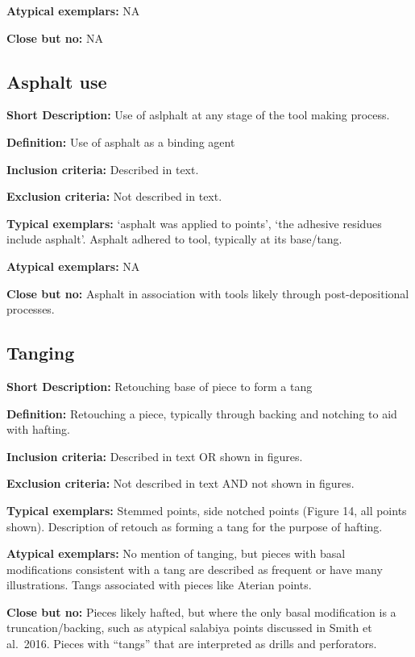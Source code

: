 \documentclass[
]{article}
\begin{document}
\textbf{Atypical exemplars:} NA

\textbf{Close but no:} NA

\hypertarget{asphalt-use}{%
\subsection{Asphalt use}\label{asphalt-use}}

\textbf{Short Description:} Use of aslphalt at any stage of the tool
making process.

\textbf{Definition:} Use of asphalt as a binding agent

\textbf{Inclusion criteria:} Described in text.

\textbf{Exclusion criteria:} Not described in text.

\textbf{Typical exemplars:} `asphalt was applied to points', `the
adhesive residues include asphalt'. Asphalt adhered to tool, typically
at its base/tang.

\textbf{Atypical exemplars:} NA

\textbf{Close but no:} Asphalt in association with tools likely through
post-depositional processes.

\hypertarget{tanging}{%
\subsection{Tanging}\label{tanging}}

\textbf{Short Description:} Retouching base of piece to form a tang

\textbf{Definition:} Retouching a piece, typically through backing and
notching to aid with hafting.

\textbf{Inclusion criteria:} Described in text OR shown in figures.

\textbf{Exclusion criteria:} Not described in text AND not shown in
figures.

\textbf{Typical exemplars:} Stemmed points, side notched points (Figure
14, all points shown). Description of retouch as forming a tang for the
purpose of hafting.

\textbf{Atypical exemplars:} No mention of tanging, but pieces with
basal modifications consistent with a tang are described as frequent or
have many illustrations. Tangs associated with pieces like Aterian
points.

\textbf{Close but no:} Pieces likely hafted, but where the only basal
modification is a truncation/backing, such as atypical salabiya points
discussed in Smith et al.~2016. Pieces with ``tangs'' that are
interpreted as drills and perforators.
\end{document}
